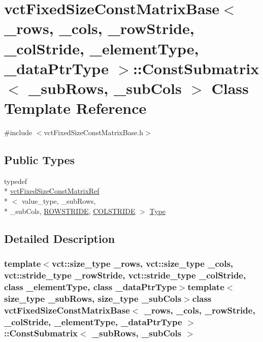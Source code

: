 \hypertarget{classvct_fixed_size_const_matrix_base_1_1_const_submatrix}{\section{vct\-Fixed\-Size\-Const\-Matrix\-Base$<$ \-\_\-rows, \-\_\-cols, \-\_\-row\-Stride, \-\_\-col\-Stride, \-\_\-element\-Type, \-\_\-data\-Ptr\-Type $>$\-:\-:Const\-Submatrix$<$ \-\_\-sub\-Rows, \-\_\-sub\-Cols $>$ Class Template Reference}
\label{classvct_fixed_size_const_matrix_base_1_1_const_submatrix}
}


{\ttfamily \#include $<$vct\-Fixed\-Size\-Const\-Matrix\-Base.\-h$>$}

\subsection*{Public Types}
\begin{DoxyCompactItemize}
\item 
typedef \\*
\hyperlink{classvct_fixed_size_const_matrix_ref}{vct\-Fixed\-Size\-Const\-Matrix\-Ref}\\*
$<$ value\-\_\-type, \-\_\-sub\-Rows, \\*
\-\_\-sub\-Cols, \hyperlink{classvct_fixed_size_const_matrix_base_a0aa9b864b8810dd6a50640c965564bd0a1249f054e777d0972eee94e9e33c3f4f}{R\-O\-W\-S\-T\-R\-I\-D\-E}, \hyperlink{classvct_fixed_size_const_matrix_base_a0aa9b864b8810dd6a50640c965564bd0aee4513ad3dee685fdda1bc2c264be993}{C\-O\-L\-S\-T\-R\-I\-D\-E} $>$ \hyperlink{classvct_fixed_size_const_matrix_base_1_1_const_submatrix_a274c4b7ec1c81155c412da08ab1e1f41}{Type}
\end{DoxyCompactItemize}


\subsection{Detailed Description}
\subsubsection*{template$<$vct\-::size\-\_\-type \-\_\-rows, vct\-::size\-\_\-type \-\_\-cols, vct\-::stride\-\_\-type \-\_\-row\-Stride, vct\-::stride\-\_\-type \-\_\-col\-Stride, class \-\_\-element\-Type, class \-\_\-data\-Ptr\-Type$>$template$<$size\-\_\-type \-\_\-sub\-Rows, size\-\_\-type \-\_\-sub\-Cols$>$class vct\-Fixed\-Size\-Const\-Matrix\-Base$<$ \-\_\-rows, \-\_\-cols, \-\_\-row\-Stride, \-\_\-col\-Stride, \-\_\-element\-Type, \-\_\-data\-Ptr\-Type $>$\-::\-Const\-Submatrix$<$ \-\_\-sub\-Rows, \-\_\-sub\-Cols $>$}

